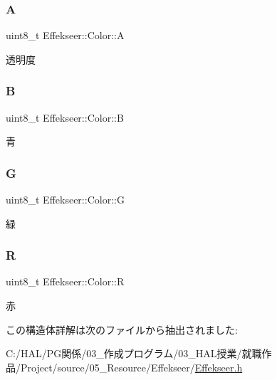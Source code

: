 \subsubsection{\texorpdfstring{A}{A}}
{\footnotesize\ttfamily uint8\+\_\+t Effekseer\+::\+Color\+::A}



透明度 

\mbox{\label{struct_effekseer_1_1_color_a0313689224c549471daa2bfe58839d84}} 
\subsubsection{\texorpdfstring{B}{B}}
{\footnotesize\ttfamily uint8\+\_\+t Effekseer\+::\+Color\+::B}



青 

\mbox{\label{struct_effekseer_1_1_color_a6d82d496ac86f8ac07ec0e8710126ef9}} 
\subsubsection{\texorpdfstring{G}{G}}
{\footnotesize\ttfamily uint8\+\_\+t Effekseer\+::\+Color\+::G}



緑 

\mbox{\label{struct_effekseer_1_1_color_aae98e2323761b1b2b2d9d182e3af3b40}} 
\subsubsection{\texorpdfstring{R}{R}}
{\footnotesize\ttfamily uint8\+\_\+t Effekseer\+::\+Color\+::R}



赤 



この構造体詳解は次のファイルから抽出されました\+:\begin{DoxyCompactItemize}
\item 
C\+:/\+H\+A\+L/\+P\+G関係/03\+\_\+作成プログラム/03\+\_\+\+H\+A\+L授業/就職作品/\+Project/source/05\+\_\+\+Resource/\+Effekseer/\mbox{\hyperlink{_effekseer_8h}{Effekseer.\+h}}\end{DoxyCompactItemize}
